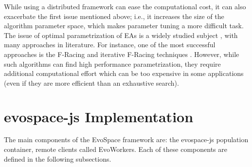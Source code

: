 While using a distributed framework can ease the computational cost, it can also exacerbate the first issue mentioned above;
i.e., it increases the size of the algorithm parameter space, which makes parameter tuning a more difficult task.
The issue of optimal parametrization of EAs is a widely studied subject \cite{de2007parameter}, 
with many approaches in literature. For instance, one of the most successful approaches 
is the F-Racing and iterative F-Racing techniques \cite{lopez2011irace}. 
However, while such algorithms can find high performance parametrization, 
they require additional computational effort which can be too expensive in some applications
(even if they are more efficient than an exhaustive search).



\section{evospace-js Implementation}
\label{sec:evo}
The main components of the EvoSpace framework are: the evospace-js population container, 
remote clients called EvoWorkers. Each of these components are defined in the following subsections.

